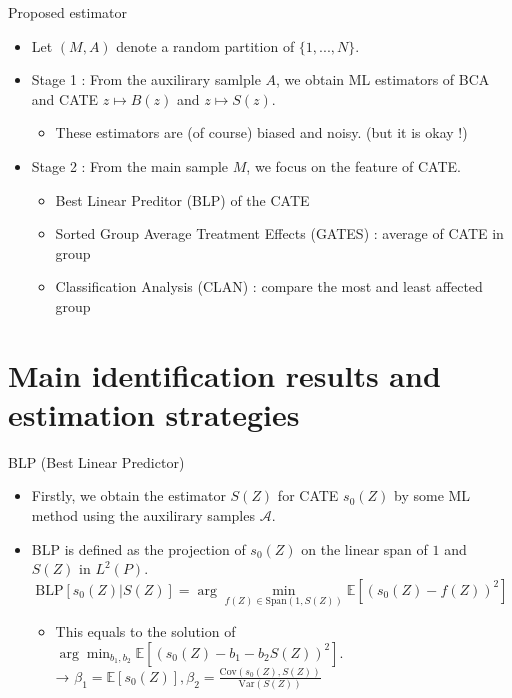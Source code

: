 \documentclass[xcolor=svgnames,aspectratio=169]{beamer}
\newcommand{\E}{\mathbb{E}}
\newcommand{\cov}{\text{Cov}}
\newcommand{\var}{\text{Var}}
\begin{document}
\begin{frame}{Proposed estimator}
    \begin{itemize}
        \item Let $(M,A)$ denote a random partition of $\{1,...,N\}$.
        \item Stage 1 : From the auxilirary samlple $A$, we obtain ML estimators of BCA and CATE $z\mapsto B(z)$ and $z\mapsto S(z)$.
        \begin{itemize}
            \item These estimators are (of course) biased and noisy. (but it is okay !) 
        \end{itemize}
        \item Stage 2 : From the main sample $M$, we focus on the \alert{feature} of CATE.
        \begin{itemize}
            \item Best Linear Preditor (BLP) of the CATE
            \item Sorted Group Average Treatment Effects (GATES) : average of CATE in group
            \item Classification Analysis (CLAN) : compare the most and least affected group
        \end{itemize}
    \end{itemize}
\end{frame}

\section{Main identification results and estimation strategies}

\begin{frame}{BLP (Best Linear Predictor)}
    \begin{itemize}
        \item Firstly, we obtain the estimator $S(Z)$ for CATE $s_0(Z)$ by some ML method using the auxilirary samples $\mathcal{A} $.
        \item BLP is defined as the projection of $s_0(Z)$ on the linear span of $1$ and $S(Z)$ in $L^2(P)$.
        \[
        \text{BLP}[s_0(Z)|S(Z)]=\arg\min_{f(Z)\in \text{Span}(1,S(Z))}\E[(s_0(Z)-f(Z))^2]
        \]
        \begin{itemize}
            \item This equals to the solution of $\arg\min_{b_1,b_2}\E[(s_0(Z)-b_1-b_2 S(Z))^2]$. \\
            → $\beta_1=\E[s_0(Z)], \beta_2=\frac{\cov(s_0(Z),S(Z))}{\var(S(Z))}$
        \end{itemize}

    \end{itemize}
\end{frame}
\end{document}
